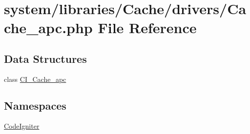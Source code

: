 \hypertarget{_cache__apc_8php}{\section{system/libraries/\-Cache/drivers/\-Cache\-\_\-apc.php File Reference}
\label{_cache__apc_8php}
}
\subsection*{Data Structures}
\begin{DoxyCompactItemize}
\item 
class \hyperlink{class_c_i___cache__apc}{C\-I\-\_\-\-Cache\-\_\-apc}
\end{DoxyCompactItemize}
\subsection*{Namespaces}
\begin{DoxyCompactItemize}
\item 
\hyperlink{namespace_code_igniter}{Code\-Igniter}
\end{DoxyCompactItemize}
